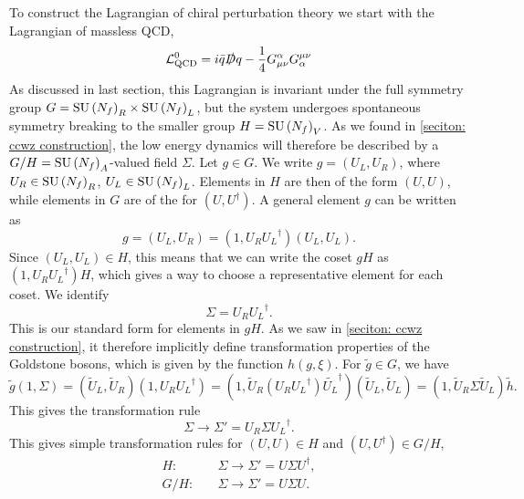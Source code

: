 To construct the Lagrangian of chiral perturbation theory we start with the Lagrangian of massless QCD, 
%
\begin{equation}
    \mathcal{L}^0_\text{QCD} = i \bar q \slashed D q - \frac{1}{4} G^\alpha_{\mu \nu} G_\alpha^{\mu \nu}
\end{equation}
%
As discussed in last section, this Lagrangian is invariant under the full symmetry group $G = \text{SU}\left(N_f\right)_R \times \text{SU}\left(N_f\right)_L$, but the system undergoes spontaneous symmetry breaking to the smaller group $H = \text{SU}\left(N_f\right)_V$.
As we found in \autoref{seciton: ccwz construction}, the low energy dynamics will therefore be described by a $G/H = \text{SU}\left(N_f\right)_A$-valued field $\Sigma$.
Let $g \in G$.
We write $g = (U_L, U_R)$, where $U_R \in \text{SU}\left(N_f\right)_R$, $U_L \in \text{SU}\left(N_f\right)_L$.
Elements in $H$ are then of the form $(U, U)$, while elements in $G$ are of the for $(U, U^\dagger)$.
A general element $g$ can be written as
%
\begin{equation}
    g = (U_L, U_R) = (1, U_R {U_L}^\dagger) (U_L, U_L).
\end{equation}
%
Since $(U_L, U_L) \in H$, this means that we can write the coset $g H$ as $(1, U_R {U_L}^\dagger)H$, which gives a way to choose a representative element for each coset.
We identify
%
\begin{equation}
    \Sigma = U_R {U_L}^\dagger. 
\end{equation}
%
This is our standard form for elements in $gH$.
As we saw in \autoref{seciton: ccwz construction}, it therefore implicitly define transformation properties of the Goldstone bosons, which is given by the function $h(g, \xi)$.
For $\tilde g \in G$, we have
%
\begin{equation}
    \tilde g (1, \Sigma)
    = (\tilde U_L, \tilde U_R) (1, U_R {U_L}^\dagger)
    = (1, \tilde U_R (U_R {U_L}^\dagger) \tilde {U_L}^\dagger) (\tilde U_L, \tilde U_L)
    = (1, \tilde U_R \Sigma \tilde U_L) \tilde h.
\end{equation}
%
This gives the transformation rule
\begin{equation}
    \Sigma \rightarrow \Sigma' = U_R \Sigma {U_L}^\dagger.
\end{equation}
%
This gives simple transformation rules for $(U, U) \in H$ and $(U, U^\dagger) \in G/H$,
\begin{align}
    \label{sigma transform under H}
    H:& \quad \Sigma \rightarrow \Sigma' = U \Sigma U^\dagger, \\
    \label{sigma transform under G/H}
    G/H:& \quad \Sigma \rightarrow \Sigma' = U \Sigma U.
\end{align}
